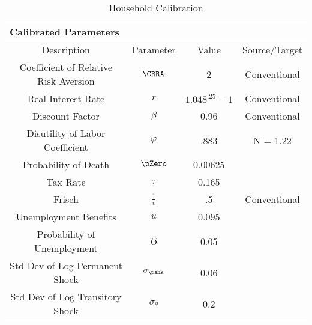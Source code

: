 \begin{table}
\begin{center}\renewcommand{\arraystretch}{1.5}
\caption{Household Calibration}\label{table:Calibration}
\begin{tabular}{|c|ccl|c|}
\hline
\multicolumn{5}{|l|}{Calibrated Parameters}  \\ \hline
Description                     & \multicolumn{1}{c}{Parameter} & Value & \multicolumn{2}{c|}{Source/Target }\\ \hline
Coefficient of Relative Risk Aversion & \multicolumn{1}{c}{$\CRRA$} & 2 & \multicolumn{2}{c|}{Conventional} \\
Real Interest Rate                 & \multicolumn{1}{c}{$r$} & $1.048^{.25} - 1$ & \multicolumn{2}{c|}{Conventional} \\
Discount Factor          & \multicolumn{1}{c}{$\beta$} & 0.96 & \multicolumn{2}{c|}{Conventional} \\
Disutility of Labor Coefficient & \multicolumn{1}{c}{$\varphi$} & .883 & \multicolumn{2}{c|}{N = 1.22} \\
Probability of Death       & \multicolumn{1}{c}{$\pZero$} & 0.00625 & \multicolumn{2}{c|}{} \\
Tax Rate       & \multicolumn{1}{c}{$\tau$} & 0.165 & \multicolumn{2}{c|}{} \\
Frisch        & \multicolumn{1}{c}{$\frac{1}{v}$} & .5 & \multicolumn{2}{c|}{Conventional} \\
Unemployment Benefits       & \multicolumn{1}{c}{$u$} & 0.095 & \multicolumn{2}{c|}{} \\
Probability of Unemployment       & \multicolumn{1}{c}{$\mho$} & 0.05 & \multicolumn{2}{c|}{} \\
Std Dev of Log Permanent Shock  & \multicolumn{1}{c}{$\sigma_{\pshk}$} & 0.06 & \multicolumn{2}{c|}{} \\
Std Dev of Log Transitory Shock & \multicolumn{1}{c}{$\sigma_{\theta}$} & 0.2 & \multicolumn{2}{c|}{} \\ \hline
\end{tabular}
\end{center}
\end{table}
